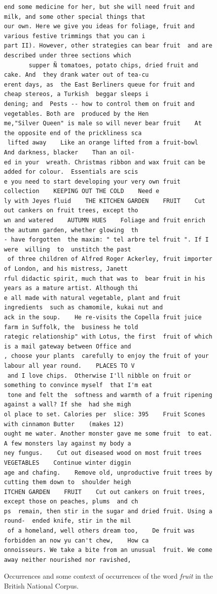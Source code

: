 \documentclass[preprint,leqno]{elsarticle}
\begin{document}
\begin{figure}
\begin{Verbatim}[fontsize=\scriptsize]
end some medicine for her, but she will need fruit and  milk, and some other special things that
our own. Here we give you ideas for foliage, fruit and  various festive trimmings that you can i
part II). However, other strategies can bear fruit  and are described under three sections which
       supper Ñ tomatoes, potato chips, dried fruit and cake. And  they drank water out of tea-cu
erent days, as  the East Berliners queue for fruit and cheap stereos, a Turkish  beggar sleeps i
dening; and  Pests -- how to control them on fruit and vegetables. Both are  produced by the Hen
me,"Silver Queen" is male so will never bear fruit    At the opposite end of the prickliness sca
 lifted away    Like an orange lifted from a fruit-bowl    And darkness, blacker    Than an oil-
ed in your  wreath. Christmas ribbon and wax fruit can be added for colour.  Essentials are scis
e you need to start developing your very own fruit  collection    KEEPING OUT THE COLD    Need e
ly with Jeyes fluid    THE KITCHEN GARDEN    FRUIT    Cut out cankers on fruit trees, except tho
wn and watered    AUTUMN HUES    Foliage and fruit enrich the autumn garden, whether glowing  th
- have forgotten  the maxim: " tel arbre tel fruit ". If I were  willing  to  unstitch the past 
 of three children of Alfred Roger Ackerley, fruit importer  of London, and his mistress, Janett
rful didactic spirit, much that was to  bear fruit in his years as a mature artist. Although thi
e all made with natural vegetable, plant and fruit ingredients  such as chamomile, kukai nut and
ack in the soup.    He re-visits the Copella fruit juice farm in Suffolk, the  business he told 
rategic relationship" with Lotus, the first  fruit of which is a mail gateway between Office and
, choose your plants  carefully to enjoy the fruit of your labour all year round.    PLACES TO V
 and I love chips.  Otherwise I'll nibble on fruit or something to convince myself  that I'm eat
 tone and felt the  softness and warmth of a fruit ripening against a wall? If she  had she migh
ol place to set. Calories per  slice: 395    Fruit Scones with cinnamon Butter    (makes 12)    
ought me water. Another monster gave me some fruit  to eat. A few monsters lay against my body a
ney fungus.    Cut out diseased wood on most fruit trees    VEGETABLES    Continue winter diggin
age and chafing.    Remove old, unproductive fruit trees by cutting them down to  shoulder heigh
ITCHEN GARDEN    FRUIT    Cut out cankers on fruit trees, except those on peaches, plums  and ch
ps  remain, then stir in the sugar and dried fruit. Using a round-  ended knife, stir in the mil
 of a homeland, well others dream too,    De fruit was forbidden an now yu can't chew,    How ca
onnoisseurs. We take a bite from an unusual  fruit. We come away neither nourished nor ravished,
\end{Verbatim}

\caption{Occurrences and some context of occurrences of the word \emph{fruit} in the British National Corpus.}
\label{fig:fruit}
\end{figure}
\end{document}
